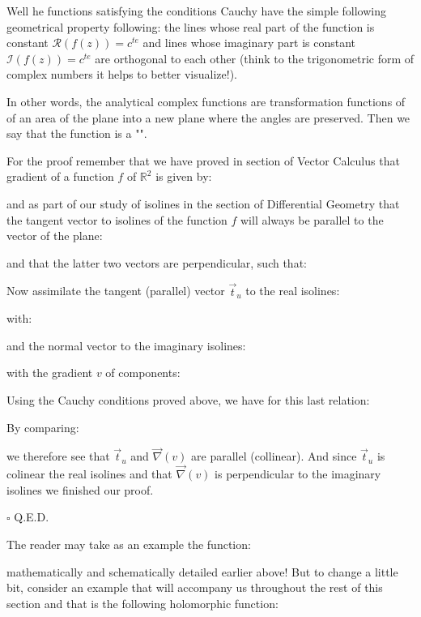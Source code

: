 	\begin{theorem}
	Well he functions satisfying the conditions Cauchy have the simple following geometrical property following: the lines whose real part of the function is constant $\mathcal{R}(f(z))=c^{te}$ and lines whose imaginary part is constant $\mathcal{I}(f(z))=c^{te}$  are orthogonal to each other (think to the trigonometric form of complex numbers it helps to better visualize!).
	
	In other words, the analytical complex functions are transformation functions of of an area of the plane into a new plane where the angles are preserved. Then we say that the function is a "".
	\end{theorem}
	
	\begin{dem}
	For the proof remember that we have proved in section of Vector Calculus that  gradient of a function $f$ of $\mathbb{R}^2$ is given by:
	
	and as part of our study of isolines in the section of Differential Geometry that the tangent vector to isolines of the function $f$ will always be parallel to the vector of the plane:
	
	and that the latter two vectors are perpendicular, such that:
	
	Now assimilate the tangent (parallel) vector $\vec{t}_u$ to the real isolines:
	
	with:
	
	and the normal vector to the imaginary isolines:
	
	with the gradient $v$ of components:
	
	Using the Cauchy conditions proved above, we have for this last relation:
	
	By comparing:
	
	we therefore see that $\vec{t}_u$ and $\vec{\nabla}(v)$ are parallel (collinear). And since $\vec{t}_u$ is colinear the real isolines and that $\vec{\nabla}(v)$  is perpendicular to the imaginary isolines we finished our proof.
	\begin{flushright}
		$\square$  Q.E.D.
	\end{flushright}
	\end{dem}
	The reader may take as an example the function:
	
	mathematically and schematically detailed earlier above! But to change a little bit, consider an example that will accompany us throughout the rest of this section and that is the following holomorphic function:
	
